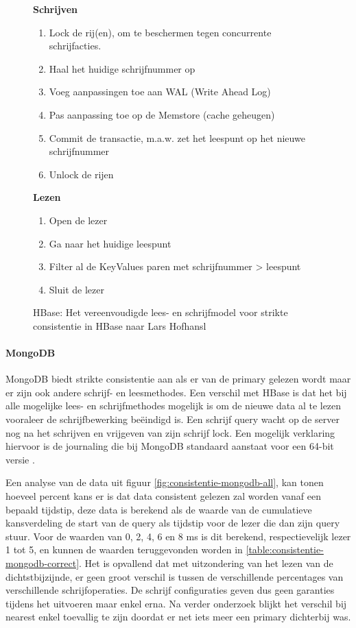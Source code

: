 \begin{figure}[tb!]
	\begin{minipage}{0.5\textwidth} 
	\textbf{Schrijven}
	\begin{enumerate}
	\item Lock de rij(en), om te beschermen tegen concurrente schrijfacties. 
	\item Haal het huidige schrijfnummer op
	\item Voeg aanpassingen toe aan WAL (Write Ahead Log)
	\item Pas aanpassing toe op de Memstore (cache geheugen)
	\item Commit de transactie, m.a.w. zet het leespunt op het nieuwe schrijfnummer
	\item Unlock de rijen
	\end{enumerate}
	\end{minipage} \hfill
	\begin{minipage}{0.3\textwidth} 
	\textbf{Lezen}
	\begin{enumerate}
	\item Open de lezer
	\item Ga naar het huidige leespunt
	\item Filter al de KeyValues paren met schrijfnummer > leespunt
	\item Sluit de lezer
	\end{enumerate}
	\end{minipage}
	\caption{HBase: Het vereenvoudigde lees- en schrijfmodel voor strikte consistentie in HBase naar Lars Hofhansl\cite{hbase-acid}}\label{fig:consistency-hbase-uitleg}
\end{figure}

\paragraph{MongoDB} MongoDB biedt strikte consistentie aan als er van de primary gelezen wordt maar er zijn ook andere schrijf- en leesmethodes. Een verschil met HBase is dat het bij alle mogelijke lees- en schrijfmethodes mogelijk is om de nieuwe data al te lezen vooraleer de schrijfbewerking beëindigd is. Een schrijf query wacht op de server nog na het schrijven en vrijgeven van zijn schrijf lock. Een mogelijk verklaring hiervoor is de journaling die bij MongoDB standaard aanstaat voor een 64-bit versie \cite{mongodb-manual}. 

Een analyse van de data uit figuur \ref{fig:consistentie-mongodb-all}, kan tonen hoeveel percent kans er is dat data consistent gelezen zal worden vanaf een bepaald tijdstip, deze data is berekend als de waarde van de cumulatieve kansverdeling de start van de query als tijdstip voor de lezer die dan zijn query stuur. Voor de waarden van 0, 2, 4, 6 en 8 ms is dit berekend, respectievelijk lezer 1 tot 5,  en kunnen de waarden teruggevonden worden in \ref{table:consistentie-mongodb-correct}. Het is opvallend dat met uitzondering van het lezen van de dichtstbijzijnde, er geen groot verschil is tussen de verschillende percentages van verschillende schrijfoperaties. De schrijf configuraties geven dus geen garanties tijdens het uitvoeren maar enkel erna.  Na verder onderzoek blijkt het verschil bij nearest enkel toevallig te zijn doordat er net iets meer een primary dichterbij was. 

